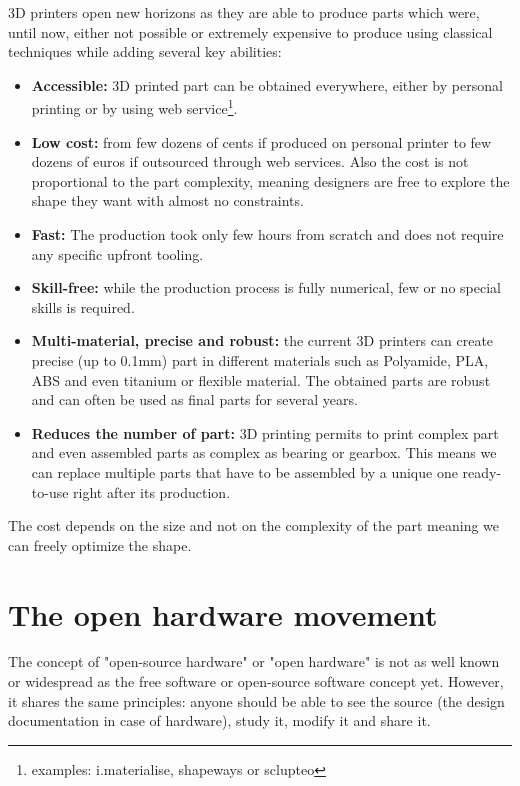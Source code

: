 3D printers open new horizons as they are able to produce parts which were, until now, either not possible or extremely expensive to produce using classical techniques while adding several key abilities:
\begin{itemize}
    \item \textbf{Accessible:} 3D printed part can be obtained everywhere, either by personal printing or by using web service\footnote{examples: i.materialise, shapeways or sclupteo}.
    \item \textbf{Low cost:}  from few dozens of cents if produced on personal printer to few dozens of euros if outsourced through web services. Also the cost is not proportional to the part complexity, meaning designers are free to explore the shape they want with almost no constraints.
    \item \textbf{Fast:} The production took only few hours from scratch and does not require any specific upfront tooling.
    \item \textbf{Skill-free:} while the production process is fully numerical, few or no special skills is required.
    \item \textbf{Multi-material, precise and robust:} the current 3D printers can create precise (up to 0.1mm) part in different materials such as Polyamide, PLA, ABS and even titanium or flexible material. The obtained parts are robust and can often be used as final parts for several years.
    \item \textbf{Reduces the number of part:} 3D printing permits to print complex part and even assembled parts as complex as bearing or gearbox. This means we can replace multiple parts that have to be assembled by a unique one ready-to-use right after its production.
\end{itemize}



The cost depends on the size and not on the complexity of the part meaning we can freely optimize the shape.


\newpage
\section{The open hardware movement} %

The concept of "open-source hardware" or "open hardware" is not as well known or widespread as the free software or open-source software concept yet. However, it shares the same principles: anyone should be able to see the source (the design documentation in case of hardware), study it, modify it and share it.


